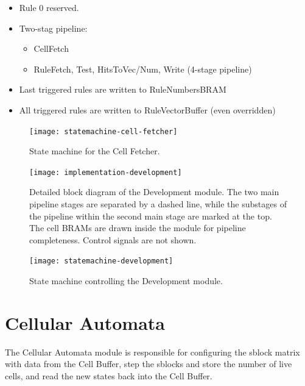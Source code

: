 \begin{itemize}
    \item Rule 0 reserved.
    \item Two-stag pipeline:
    \begin{itemize}
        \item CellFetch
        \item RuleFetch, Test, HitsToVec/Num, Write (4-stage pipeline)
    \end{itemize}
    \item Last triggered rules are written to RuleNumbersBRAM
    \item All triggered rules are written to RuleVectorBuffer (even overridden)
\end{itemize}

\begin{figure}[!ht]
    \centering
    \texttt{[image: statemachine-cell-fetcher]}
    \caption[Cell Fetcher state machine]{
        State machine for the Cell Fetcher.
    }
    \label{fig:implementation-cell-fetcher}
\end{figure}

\begin{figure}[!ht]
    \centering
    \texttt{[image: implementation-development]}
    \caption[Development module]{
        Detailed block diagram of the Development module.
        The two main pipeline stages are separated by a dashed line,
        while the substages of the pipeline within the second main stage are marked at the top.
        The cell BRAMs are drawn inside the module for pipeline completeness.
        Control signals are not shown.
    }
    \label{fig:implementation-development}
\end{figure}

\begin{figure}[!ht]
    \centering
    \texttt{[image: statemachine-development]}
    \caption[Development module state machine]{
        State machine controlling the Development module.
    }
    \label{fig:statemachine-development}
\end{figure}


\section{Cellular Automata}

The Cellular Automata module is responsible for configuring the sblock matrix with data from the Cell Buffer, step the sblocks and store the number of live cells, and read the new states back into the Cell Buffer.

